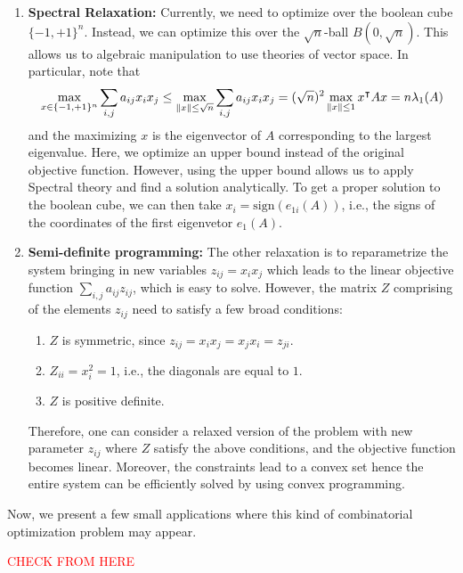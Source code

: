 \documentclass[12pt]{article}
\newcommand{\sr}[1]{\textcolor{red}{#1}}
\begin{document}
\begin{enumerate}
    \item \textbf{Spectral Relaxation:} Currently, we need to optimize over the boolean cube $\{-1, +1\}^n$. Instead, we can optimize this over the $\sqrt{n}$-ball $B(0, \sqrt{n})$. This allows us to algebraic manipulation to use theories of vector space. In particular, note that 
    \begin{equation*}
        \max_{x \in \{-1, +1\}^n} \sum_{i,j} a_{ij}x_i x_j \leq \max_{\left\Vert x \right\Vert \leq \sqrt{n}} \sum_{i,j} a_{ij}x_ix_j = (\sqrt{n})^2 \max_{\left\Vert x \right\Vert \leq 1} x^{\intercal} Ax = n \lambda_1(A)
    \end{equation*}
    \noindent and the maximizing $x$ is the eigenvector of $A$ corresponding to the largest eigenvalue. Here, we optimize an upper bound instead of the original objective function. However, using the upper bound allows us to apply Spectral theory and find a solution analytically. To get a proper solution to the boolean cube, we can then take $x_i = \text{sign}(e_{1i}(A))$, i.e., the signs of the coordinates of the first eigenvetor $e_1(A)$.
    \item \textbf{Semi-definite programming:} The other relaxation is to reparametrize the system bringing in new variables $z_{ij} = x_i x_j$ which leads to the linear objective function $\sum_{i,j}a_{ij}z_{ij}$, which is easy to solve. However, the matrix $Z$ comprising of the elements $z_{ij}$ need to satisfy a few broad conditions:
    \begin{enumerate}
        \item $Z$ is symmetric, since $z_{ij} = x_i x_j = x_j x_i = z_{ji}$.
        \item $Z_{ii} = x_i^2 = 1$, i.e., the diagonals are equal to $1$.
        \item $Z$ is positive definite.
    \end{enumerate}
    \noindent Therefore, one can consider a relaxed version of the problem with new parameter $z_{ij}$ where $Z$ satisfy the above conditions, and the objective function becomes linear. Moreover, the constraints lead to a convex set hence the entire system can be efficiently solved by using convex programming.
\end{enumerate}

Now, we present a few small applications where this kind of combinatorial optimization problem may appear.








\pagebreak
\sr{CHECK FROM HERE}
\end{document}
